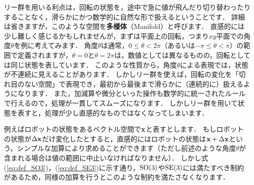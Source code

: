 リー群を用いる利点は，回転の状態を，途中で急に値が飛んだり切り替わったりすることなく，滑らかにかつ数学的に自然な形で扱えるということです．
詳細は省きますが，このような空間を{\bf 多様体}（Manifold）と呼びます．
直感的には少し難しく感じるかもしれませんが，まずは平面上の回転，つまり$xy$平面での角度$\theta$を例に考えてみます．
角度$\theta$は通常，$0 \leq \theta < 2\pi$（あるいは$-\pi \leq \theta < \pi$）の範囲で定義されますが，$\theta = 0$と$\theta = 2\pi$は，数値としては異なるものの，回転としては同じ状態を表しています．
このような性質から，角度$\theta$による表現では，状態が不連続に見えることがあります．
しかしリー群を使えば，回転の変化を「切れ目のない空間」で表現でき，最初から最後まで滑らかに（連続的に）扱えるようになります．
また，加減算や微分といった操作も数学的に統一されたルールで行えるので，処理が一貫してスムーズになります．
しかしリー群を用いて状態を表すと，処理が少し直感的なものではなくなってしまいます．

例えばロボットの状態をあるベクトル空間で${\bf x}$と表すとします．
もしロボットの状態が$\Delta {\bf x}$だけ変化したとすると，直感的にはロボットの状態は${\bf x} + \Delta {\bf x}$という，シンプルな加算により求めることができます（ただし前述のような角度$\theta$が含まれる場合は値の範囲に中止いなければなりません）．
しかし式(\ref{eq:def_SO3})，(\ref{eq:def_SE3})に示す通り，${\rm SO}(3)$や${\rm SE}(3)$には満たすべき制約があるため，同様の加算を行うとこのような制約を満たさなくなります．

